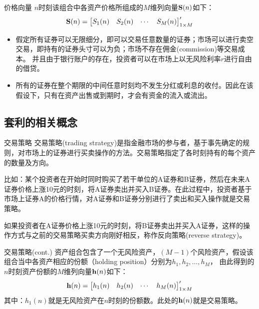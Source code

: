\documentclass[t]{beamer}
\begin{document}
\begin{frame}{价格向量}
$n$时刻该组合中各资产价格所组成的$M$维列向量${\bf S}(n)$如下：
\begin{equation*}
{\bf S}(n)=\begin{bmatrix}
S_1(n)& S_2(n)&\cdots& S_M(n)
\end{bmatrix}' _{1\times M}
\end{equation*}

\begin{itemize}
\item 假定所有证券可以无限细分，即可以交易任意数量的证券；市场可以进行卖空交易，即持有的证券头寸可以为负；市场不存在佣金(commission)等交易成本。
并且由于银行账户的存在，投资者可以在市场上以无风险利率$r$进行自由的借贷。
\item
 所有的证券在整个期限的中间任意时刻均不发生分红或利息的收付。因此在该假设下，只有在资产出售或到期时，才会有资金的流入或流出。
\end{itemize}
\end{frame}

\subsection{套利的相关概念}
\begin{frame}{交易策略}
交易策略(trading strategy)是指金融市场的参与者，基于事先确定的规则，对市场上的证券进行买卖操作的方法。交易策略指定了各时刻持有的每个资产的数量及方向。

比如：某个投资者在开始时同时购买了若干单位的A证券和B证券，然后在未来A证券价格上涨10元的时刻，{\color{red}将A证券卖出并买入B证券}。在此过程中，投资者基于市场上证券A的价格行情，对A证券和B证券分别进行了卖出和买入操作就是交易策略。

如果投资者在A证券价格上涨10元的时刻，{\color{blue}将B证券卖出并买入A证券}，这样的操作方式与之前的交易策略买卖方向刚好相反，称作反向策略(reverse strategy)。
\end{frame}


\begin{frame}{交易策略(cont.)}
资产组合包含了一个无风险资产，$(M-1)$个风险资产，假设该组合当中各资产相应的份额（holding position）分别为$h_1, h_2,\ldots, h_M$，
由此得到的$n$时刻资产份额的$M$维列向量${\bf h}(n)$如下：
\begin{equation*}
{\bf h}(n)=\begin{bmatrix}
h_1(n)& h_2(n)&\cdots& h_M(n)
\end{bmatrix}' _{1\times M}
\end{equation*}
其中：$h_1(n)$就是无风险资产在$n$时刻的份额数。此处的${\bf h}(n)$就是交易策略。
\end{frame}
\end{document}
